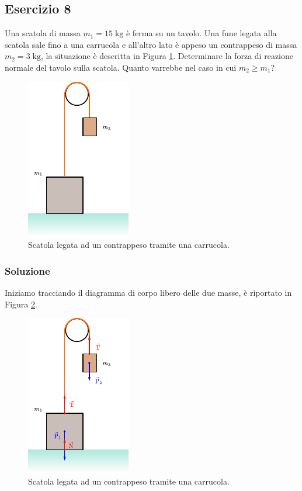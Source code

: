 \documentclass[12pt,a4paper]{book}
\begin{document}
\subsection*{Esercizio 8}
Una scatola di massa $m_1=15\;\text{kg}$ è ferma su un tavolo. Una fune legata alla scatola sale fino a una carrucola e all'altro lato è appeso un contrappeso di massa $m_2=3\;\text{kg}$, la situazione è descritta in Figura \ref{fig:4-e-9-1}. Determinare la forza di reazione normale del tavolo sulla scatola. Quanto varrebbe nel caso in cui $m_2 \geq m_1$?

\begin{figure}[!ht]
\centering
\includegraphics[scale=1.5]{e-9-1.pdf}
\caption{Scatola legata ad un contrappeso tramite una carrucola.} 
\label{fig:4-e-9-1} 
\end{figure}

\subsubsection*{Soluzione}
Iniziamo tracciando il diagramma di corpo libero delle due masse, è riportato in Figura \ref{fig:4-e-9-2}.

\begin{figure}[!ht]
\centering
\includegraphics[scale=2]{e-9-2.pdf}
\caption{Scatola legata ad un contrappeso tramite una carrucola.} 
\label{fig:4-e-9-2} 
\end{figure}
\end{document}
